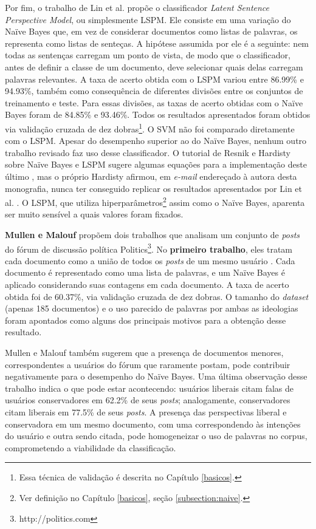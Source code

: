 Por fim, o trabalho de Lin et al. propõe o classificador \emph{Latent Sentence Perspective Model}, ou simplesmente LSPM. Ele consiste em uma variação do Naïve Bayes que, em vez de considerar documentos como listas de palavras, os representa como listas de senteças. A hipótese assumida por ele é a seguinte: nem todas as sentenças carregam um ponto de vista, de modo que o classificador, antes de definir a classe de um documento, deve selecionar quais delas carregam palavras relevantes. A taxa de acerto obtida com o LSPM variou entre  86.99\% e 94.93\%, também como consequência de diferentes divisões entre os conjuntos de treinamento e teste. Para essas divisões, as taxas de acerto obtidas com o Naïve Bayes foram de 84.85\% e 93.46\%. Todos os resultados apresentados foram obtidos via validação cruzada de dez dobras\footnote{Essa técnica de validação é descrita no Capítulo \ref{basicos}.}. O SVM não foi comparado diretamente com o LSPM. Apesar do desempenho superior ao do Naïve Bayes, nenhum outro trabalho revisado faz uso desse classificador. O tutorial de Resnik e Hardisty sobre Naïve Bayes e LSPM sugere algumas equações para a implementação deste último \cite{resnik}, mas o próprio Hardisty afirmou, em \emph{e-mail} endereçado à autora desta monografia, nunca ter conseguido replicar os resultados apresentados por Lin et al. \cite{email}. O LSPM, que utiliza hiperparâmetros\footnote{Ver definição no Capítulo \ref{basicos}, seção \ref{subsection:naive}.} assim como o Naïve Bayes, aparenta ser muito sensível a quais valores foram fixados.

\textbf{Mullen e Malouf} propõem dois trabalhos que analisam um conjunto de \emph{posts} do fórum de discussão política Politics\footnote{http://politics.com}. No \textbf{primeiro trabalho}, eles tratam cada documento como a união de todos os \emph{posts} de um mesmo usuário \cite{aaai-politics}. Cada documento é representado como uma lista de palavras, e um Naïve Bayes é aplicado considerando suas contagens em cada documento. A taxa de acerto obtida foi de 60.37\%, via validação cruzada de dez dobras. O tamanho do \emph{dataset} (apenas 185 documentos) e o uso parecido de palavras por ambas as ideologias foram apontados como alguns dos principais motivos para a obtenção desse resultado.

Mullen e Malouf também sugerem que a presença de documentos menores, correspondentes a usuários do fórum que raramente postam, pode contribuir negativamente para o desempenho do Naïve Bayes. Uma última observação desse trabalho indica o que pode estar acontecendo: usuários liberais citam falas de usuários conservadores em 62.2\% de seus \emph{posts}; analogamente, conservadores citam liberais em 77.5\%  de seus \emph{posts}. A presença das perspectivas liberal e conservadora em um mesmo documento, com uma correspondendo às intenções do usuário e outra sendo citada, pode homogeneizar o uso de palavras no corpus, comprometendo a viabilidade da classificação.

